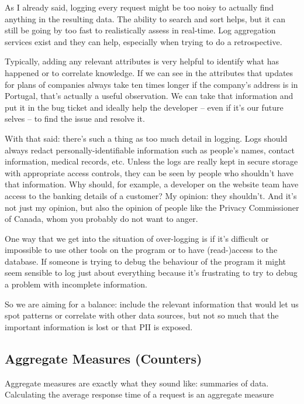 \documentclass[a4paper]{report}
\begin{document}
As I already said, logging every request might be too noisy to actually find anything in the resulting data. The ability to search and sort helps, but it can still be going by too fast to realistically assess in real-time. Log aggregation services exist and they can help, especially when trying to do a retrospective.

Typically, adding any relevant attributes is very helpful to identify what has happened or to correlate knowledge. If we can see in the attributes that updates for plans of companies always take ten times longer if the company's address is in Portugal, that's actually a useful observation. We can take that information and put it in the bug ticket and ideally help the developer -- even if it's our future selves -- to find the issue and resolve it.

With that said: there's such a thing as too much detail in logging. Logs should always redact personally-identifiable information such as people's names, contact information, medical records, etc. Unless the logs are really kept in secure storage with appropriate access controls, they can be seen by people who shouldn't have that information. Why should, for example, a developer on the website team have access to the banking details of a customer? My opinion: they shouldn't. And it's not just my opinion, but also the opinion of people like the Privacy Commissioner of Canada, whom you probably do not want to anger.

One way that we get into the situation of over-logging is if it's difficult or impossible to use other tools on the program or to have (read-)access to the database. If someone is trying to debug the behaviour of the program it might seem sensible to log just about everything because it's frustrating to try to debug a problem with incomplete information. 

So we are aiming for a balance: include the relevant information that would let us spot patterns or correlate with other data sources, but not so much that the important information is lost or that PII is exposed.

\subsection*{Aggregate Measures (Counters)}

Aggregate measures are exactly what they sound like: summaries of data. Calculating the average response time of a request is an aggregate measure 
\end{document}
